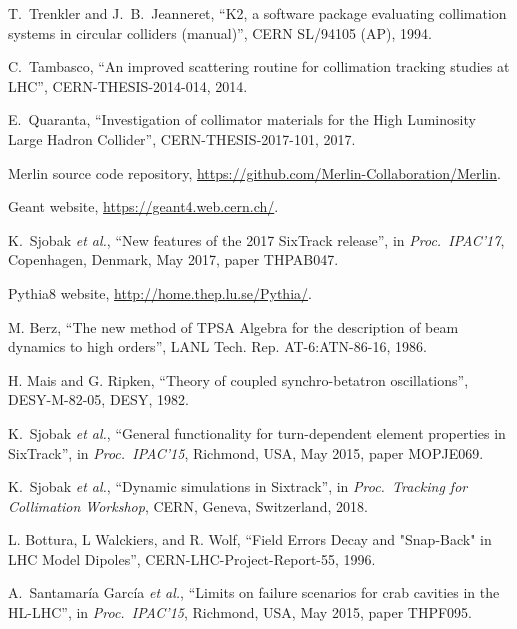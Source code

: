 \documentclass[a4paper,
              ]{jacow}
\begin{document}
\begin{thebibliography}{99}
T.~Trenkler and J.~B.~Jeanneret,
``K2, a software package evaluating collimation systems in circular colliders (manual)'',
CERN SL/94105 (AP), 1994.

C.~Tambasco,
``An improved scattering routine for collimation tracking studies at LHC'',
CERN-THESIS-2014-014, 2014.

E.~Quaranta,
``Investigation of collimator materials for the High Luminosity Large Hadron Collider'',
CERN-THESIS-2017-101, 2017.

Merlin source code repository,
\url{https://github.com/Merlin-Collaboration/Merlin}.

Geant website,
\url{https://geant4.web.cern.ch/}.

K.~Sjobak \emph{et al.},
``New features of the 2017 SixTrack release'',
in \emph{Proc.~IPAC'17}, Copenhagen, Denmark, May 2017, paper THPAB047.

Pythia8 website,
\url{http://home.thep.lu.se/Pythia/}.

M. Berz,
``The new method of TPSA Algebra for the description of beam dynamics to high orders'',
LANL Tech. Rep. AT-6:ATN-86-16, 1986.

H. Mais and G. Ripken,
``Theory of coupled synchro-betatron oscillations'',
DESY-M-82-05, DESY, 1982.

K.\ Sjobak {\it et al.}, ``General functionality for turn-dependent element properties in SixTrack'', in \textit{Proc.~IPAC'15}, Richmond, USA, May 2015, paper MOPJE069.

K.\ Sjobak {\it et al.},
``Dynamic simulations in Sixtrack'', in \emph{Proc.~Tracking for Collimation Workshop}, CERN, Geneva, Switzerland, 2018.

L. Bottura, L Walckiers, and R. Wolf, ``Field Errors Decay and "Snap-Back" in LHC Model Dipoles'', CERN-LHC-Project-Report-55, 1996.

A.~Santamaría García {\it et al.},
``Limits on failure scenarios for crab cavities in the HL-LHC'',
in {\it Proc.~IPAC’15}, Richmond, USA, May 2015, paper THPF095.


\end{thebibliography}
\end{document}
